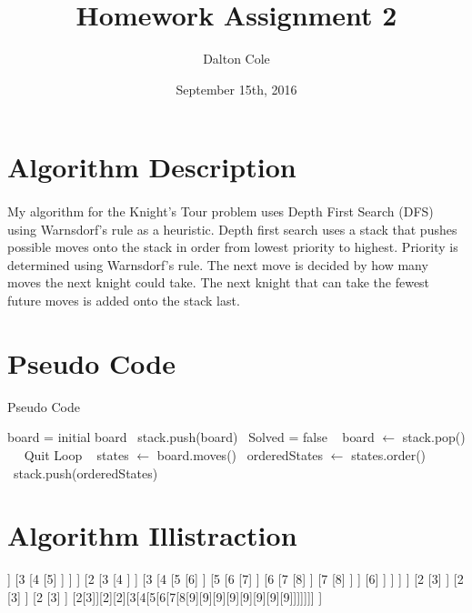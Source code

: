 \documentclass{article}
\title{Homework Assignment 2}
\author{Dalton Cole}
\date{September 15th, 2016}
\begin{document}
\maketitle

\pagebreak

\section{Algorithm Description}


\paragraph{}
My algorithm for the Knight's Tour problem uses Depth First Search (DFS) using Warnsdorf's rule as a heuristic. Depth first search
uses a stack that pushes possible moves onto the stack in order from lowest priority to highest. Priority is determined using
Warnsdorf's rule. The next move is decided by how many moves the next knight could take. The next knight that can take the fewest
future moves is added onto the stack last.

\section{Pseudo Code}


\begin{algorithm}
\caption{Pseudo Code}\label{euclid}
\begin{algorithmic}[1]
\State board = initial board \
\State stack.push(board) \
\State Solved = false \
	\State board $\gets$ stack.pop() \
	 \
		\State Quit Loop \
	\EndIf
	\State states $\gets$ board.moves() \
	\State orderedStates $\gets$ states.order() \
	\State stack.push(orderedStates) \
\EndWhile
\EndProcedure
\end{algorithmic}
\end{algorithm}

\section{Algorithm Illistraction}

\begin{center}
\begin{forest}
  [1
    [2
     [3
       [4]
     ]
     [3
       [4
         [5]
       ]
     ]
    ]
    [2
      [3
        [4
        ]
      ]
      [3
        [4
          [5
            [6]
          ]
          [5
            [6
              [7]
            ]
            [6
              [7
                [8]
              ]
              [7
                [8]
              ]
            ]
            [6]
          ]
        ]
      ]
    ]
    [2
      [3]
    ]
    [2
      [3]
    ]
    [2
      [3]
    ]
    [2[3]][2][2][3[4[5[6[7[8[9][9][9][9][9][9][9][9]]]]]]]
  ]
\end{forest}
\end{center}
\end{document}
